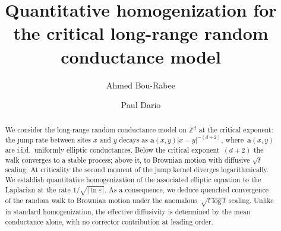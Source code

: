 \documentclass[11pt]{amsart}
\title[Homogenization for the critical long-range random conductance model]{Quantitative homogenization for the critical long-range random conductance model}
\author{Ahmed Bou-Rabee}
\author{Paul Dario}
\theoremstyle{plain}
\theoremstyle{definition}
\theoremstyle{remark}
\renewcommand{\a}{\mathbf{a}}
\begin{document}
	
	\begin{abstract}
		We consider the long-range random conductance model on $\mathbb{Z}^d$ at the critical exponent: the jump rate between sites $x$ and $y$ decays as $\a(x,y) |x-y|^{-(d+2)}$, where~$\a(x,y)$ are i.i.d.\ uniformly elliptic conductances.
		Below the critical exponent~$(d+2)$ the walk converges to a stable process; above it, to Brownian motion with diffusive $\sqrt{t}$ scaling.
		At criticality the second moment of the jump kernel diverges logarithmically.
		We establish quantitative homogenization of the associated elliptic equation to the Laplacian at the rate $1/\sqrt{|\ln\varepsilon|}$.
		As a consequence, we deduce quenched convergence of the random walk to Brownian motion under the anomalous~$\sqrt{t \log t}$ scaling.
		Unlike in standard homogenization, the effective diffusivity is determined by the mean conductance alone, with no corrector contribution at leading order.
	\end{abstract}
	
	
	
	
	\maketitle

\end{document}

